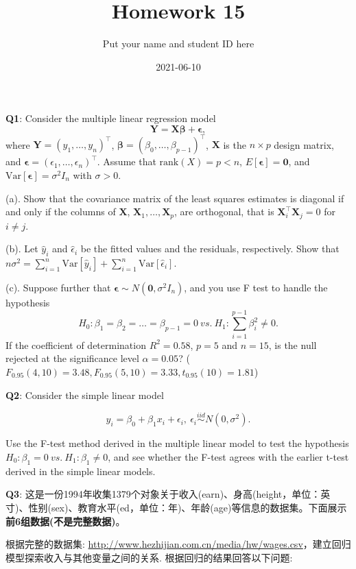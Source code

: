 \documentclass[]{article}
\title{Homework 15}
\author{Put your name and student ID here}
\date{2021-06-10}
\begin{document}
\maketitle

\textbf{Q1}: Consider the multiple linear regression model \[
\boldsymbol{Y} = \boldsymbol{X}\boldsymbol {\beta} + \boldsymbol\epsilon,
\] where \(\boldsymbol Y=(y_1,\dots,y_n)^\top\),
\(\boldsymbol\beta=(\beta_0,\dots,\beta_{p-1})^\top\), \(\boldsymbol X\)
is the \(n\times p\) design matrix, and
\(\boldsymbol\epsilon=(\epsilon_1,\dots,\epsilon_n)^\top\). Assume that
\(\mathrm{rank}(X)=p<n\), \(E[\boldsymbol\epsilon]=\boldsymbol 0\), and
\(\mathrm{Var}[\boldsymbol\epsilon]= \sigma^2 I_n\) with \(\sigma>0\).

(a). Show that the covariance matrix of the least squares estimates is
diagonal if and only if the columns of \(\boldsymbol{X}\),
\(\boldsymbol{X}_1,\dots,\boldsymbol{X}_p\), are orthogonal, that is
\(\boldsymbol{X}_i^\top \boldsymbol{X}_j=0\) for \(i\neq j\).

(b). Let \(\hat y_i\) and \(\hat\epsilon_i\) be the fitted values and
the residuals, respectively. Show that
\(n\sigma^2 = \sum_{i=1}^n \mathrm{Var}[\hat y_i]+\sum_{i=1}^n\mathrm{Var}[\hat\epsilon_i]\).

(c). Suppose further that
\(\boldsymbol\epsilon\sim N(\boldsymbol 0,\sigma^2 I_n)\), and you use F
test to handle the hypothesis
\[H_0: \beta_1=\beta_2=\dots=\beta_{p-1}=0\ vs.\ H_1:\sum_{i=1}^{p-1} \beta_i^2\neq0.\]
If the coefficient of determination \(R^2=0.58\), \(p = 5\) and
\(n=15\), is the null rejected at the significance level
\(\alpha =0.05\)?
(\(F_{0.95}(4,10)=3.48,F_{0.95}(5,10)=3.33,t_{0.95}(10)=1.81\))

\textbf{Q2}: Consider the simple linear model

\[y_i= \beta_0+\beta_1x_i+\epsilon_i,\ \epsilon_i\stackrel{iid}{\sim} N(0,\sigma^2).\]

Use the F-test method derived in the multiple linear model to test the
hypothesis \(H_0:\beta_1=0\ vs.\ H_1:\beta_1\neq 0\), and see whether
the F-test agrees with the earlier t-test derived in the simple linear
models.

\textbf{Q3}:
这是一份1994年收集1379个对象关于收入(earn)、身高(height，单位：英寸)、性别(sex)、教育水平(ed，单位：年)、年龄(age)等信息的数据集。下面展示\textbf{前6组数据(不是完整数据)}。

根据完整的数据集:
\url{http://www.hezhijian.com.cn/media/hw/wages.csv}，建立回归模型探索收入与其他变量之间的关系.
根据回归的结果回答以下问题:
\end{document}
